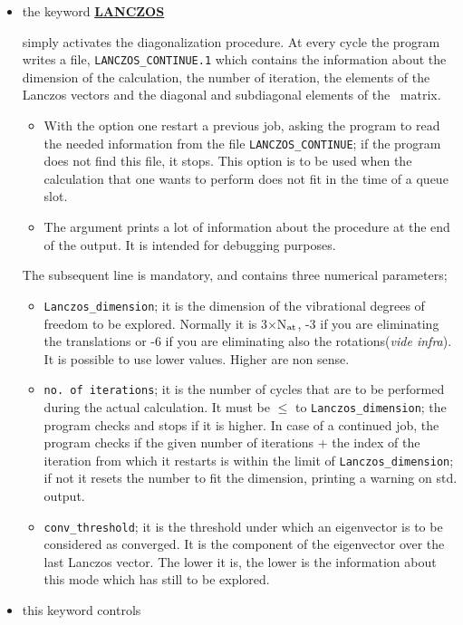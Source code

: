 \documentclass[twoside,10pt,titlepage,a4paper]{article}
\newcommand{\referto}[2]{\hyperlink{#1}{#2}}
\newcommand{\referto}[2]{\htmlref{#2}{#1}}
\newcommand{\refkeyword}[1]{%
\referto{#1}{\textbf{#1}}%
\index{#1}%
}%
\begin{document}
\begin{itemize}

\item {} the keyword \refkeyword{LANCZOS}
simply activates the diagonalization procedure. At every cycle the program
writes a file, {\tt LANCZOS\_CONTINUE.1} which contains the information
about the dimension of the calculation, the number of iteration, the
elements of the Lanczos vectors and the diagonal and subdiagonal
elements of the \bT\ matrix.
\begin{itemize}
\item With the option  one
restart a previous job, asking the program to read the needed information
from the file {\tt LANCZOS\_CONTINUE}; if the program does not find this file,
it stops. This option is to be used when the calculation that one wants
to perform does not fit in the time of a queue slot.
\item The argument  prints a lot of information about
the procedure at the end of the output. It is intended for debugging purposes.
\end{itemize}
The subsequent line is mandatory, and contains three numerical
parameters;
\begin{itemize}
\item {\tt Lanczos\_dimension}; it is the dimension of the vibrational
degrees of freedom to be explored. Normally it is 3$\times$N$_{\rm at}$,
-3 if you are eliminating the translations or -6 if you are eliminating
also the rotations({\em vide infra}). It is possible to use lower values.
Higher are non sense.
\item {\tt no. of iterations}; it is the number of cycles that are to be
performed during the actual calculation. It must be $\leq$ to
{\tt Lanczos\_dimension}; the program checks and stops if it is higher.
In case of a continued job, the program checks if the given number of
iterations + the index of the iteration from which it restarts is
within the limit of {\tt Lanczos\_dimension}; if not it resets the
number to fit the dimension, printing a warning on std. output.
\item {\tt conv\_threshold}; it is the threshold under which an eigenvector
is to be considered as converged. It is the component of the eigenvector
over the last Lanczos vector. The lower it is, the lower is the information
about this mode which has still to be explored.
\end{itemize}
\item {} this keyword controls

\end{itemize}
\end{document}
